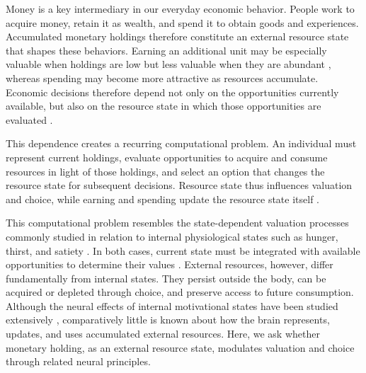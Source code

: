 \documentclass[pdflatex,sn-mathphys-num]{sn-jnl}%
\begin{document}
Money is a key intermediary in our everyday economic behavior. People work to acquire money, retain it as wealth, and spend it to obtain goods and experiences. Accumulated monetary holdings therefore constitute an external resource state that shapes these behaviors. Earning an additional unit may be especially valuable when holdings are low but less valuable when they are abundant \cite{bernoulli1954exposition}, whereas spending may become more attractive as resources accumulate. Economic decisions therefore depend not only on the opportunities currently available, but also on the resource state in which those opportunities are evaluated \cite{cesarini2017effect,vanags2025greater,harvey2022developmental}.

This dependence creates a recurring computational problem. An individual must represent current holdings, evaluate opportunities to acquire and consume resources in light of those holdings, and select an option that changes the resource state for subsequent decisions. Resource state thus influences valuation and choice, while earning and spending update the resource state itself \cite{mangel1986unified,mangel1988dynamic}.

This computational problem resembles the state-dependent valuation processes commonly studied in relation to internal physiological states such as hunger, thirst, and satiety \citep{piech2009appetite,yamada2013thirst,pastorbernier2021satiety}. In both cases, current state must be integrated with available opportunities to determine their values \citep{juechems2019value}. External resources, however, differ fundamentally from internal states. They persist outside the body, can be acquired or depleted through choice, and preserve access to future consumption. Although the neural effects of internal motivational states have been studied extensively \citep{encarnacionrivera2025drives,piech2009appetite,bouret2010motivation,pastorbernier2021satiety}, comparatively little is known about how the brain represents, updates, and uses accumulated external resources. Here, we ask whether monetary holding, as an external resource state, modulates valuation and choice through related neural principles.
\end{document}
